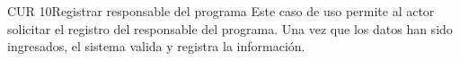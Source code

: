 
\begin{UseCase}{CUR 10}{Registrar responsable del programa}
	{
	  Este caso de uso permite al actor solicitar el registro del responsable del programa. Una vez que los datos han sido ingresados, el sistema valida y registra la información. 
	}
	


\end{UseCase}
